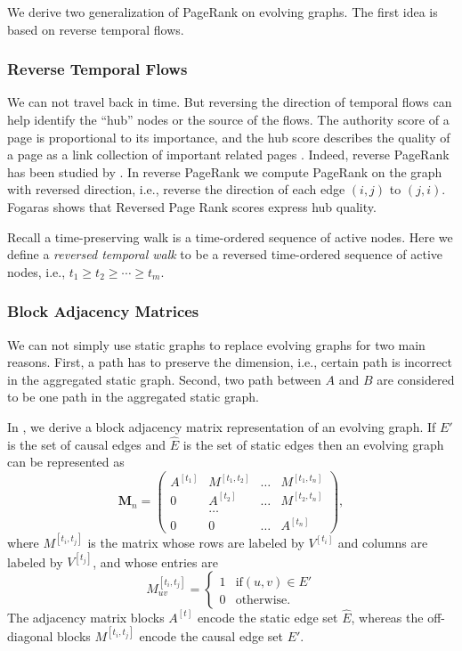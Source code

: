 \documentclass[12pt]{article}
\theoremstyle{definition}
\begin{document}
We derive two generalization of PageRank on evolving graphs.
The first idea is based on reverse temporal flows.

\subsubsection{Reverse Temporal Flows}

We can not travel back in time. But reversing the direction of temporal flows can help
identify the ``hub'' nodes or the source of the flows. The authority score of a page is
proportional to its importance, and the hub score describes the quality of a page as a link collection of important related pages \cite{kleinberg99}.
Indeed, reverse PageRank has
been studied by \cite{bar08, fogaras03, gleich15}. In reverse PageRank we compute PageRank on the graph with reversed direction, i.e., reverse the direction of each edge $(i,j)$ to $(j, i)$.
Fogaras \cite{fogaras03} shows that Reversed Page Rank scores express hub quality.


Recall a time-preserving walk is a time-ordered sequence of active nodes. Here we define a \emph{reversed temporal walk} to be a reversed time-ordered sequence of active nodes, i.e.,
$t_1 \ge t_2 \ge \cdots \ge t_m$.


\subsubsection{Block Adjacency Matrices}
\label{sec:centr-block-adjac}

We can not simply use static graphs to replace evolving graphs for two main reasons.
First, a path has to preserve the dimension, i.e., certain path is incorrect in the aggregated static graph.
Second, two path between $A$ and $B$ are considered to be one path in the aggregated static graph.

In \cite{chen16}, we derive a block adjacency matrix representation of an evolving graph.
If $E'$ is the set of causal edges and $\hat E$ is the set of static edges then
an evolving graph can be represented as
$$
\bm M_n =
\begin{pmatrix}
A^{[t_1]} & M^{[t_1, t_2]} & \ldots & M^{[t_1, t_n]} \\
0         & A^{[t_2]} & \ldots & M^{[t_2, t_n]} \\
          & \ldots    &        &     \\
0         & 0         & \ldots & A^{[t_n]}
\end{pmatrix},
$$
where $M^{[t_i, t_j]}$ is the matrix whose rows are labeled by $V^{[t_i]}$ and columns are labeled by $V^{[t_j]}$, and whose entries are
$$
  M_{uv}^{[t_i, t_j]} =
  \begin{cases}
    1 & \mbox{if} (u, v) \in E' \\
    0 & \mbox{otherwise}.
  \end{cases}
$$
The adjacency matrix blocks $A^{[t]}$ encode the static edge set $\hat E$, whereas the off-diagonal blocks $M^{[t_i, t_j]}$ encode the causal edge set $E'$.
\end{document}
